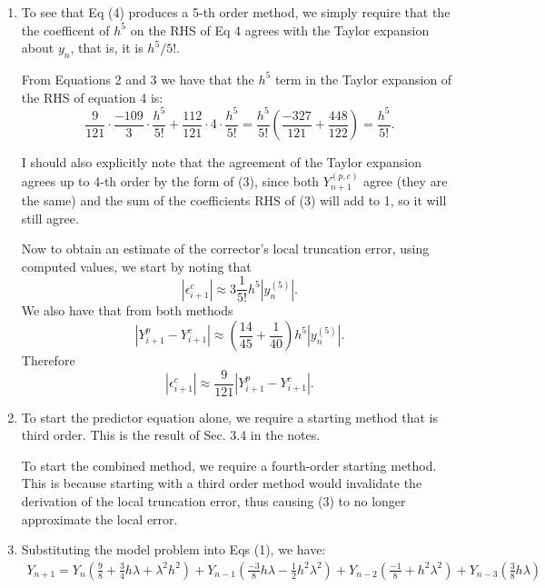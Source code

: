\documentclass[11pt]{article}
\def\f{\frac }
\begin{document}
\begin{enumerate}
\begin{enumerate}
\item To see that Eq (4) produces a 5-th order method, we simply require that the the coefficent of $h^5$ on the RHS of Eq 4 agrees with the Taylor expansion about $y_n$, that is, it is $h^5/5!$.

From Equations 2 and 3 we have that the $h^5$ term in the Taylor expansion of the RHS of equation 4 is:
\[ \f{9}{121} \cdot \f{-109}{3} \cdot \f{h^5}{5!} + \f{112}{121} \cdot 4 \cdot \f{h^5}{5!}  = \f{h^5}{5!} \left ( \f{-327}{121} + \f{448}{122} \right ) = \f{h^5}{5!} .\]

I should also explicitly note that the agreement of the Taylor expansion agrees up to 4-th order by the form of (3), since both $Y_{n+1} ^{(p,c)}$ agree (they are the same) and the sum of the coefficients RHS of (3) will add to 1, so it will still agree.

Now to obtain an estimate of the corrector's local truncation error, using computed values, we start by noting that
\[ \left |\epsilon ^c _{i+1} \right | \approx 3\f{1}{5!} h^5 \left | y_n^{(5)} \right | .\]
We also have that from both methods
\[ \left | Y_{i+1} ^p - Y_{i+1} ^c \right | \approx \left ( \f{14}{45} + \f{1}{40} \right ) h^5 \left | y_{n}^{(5)} \right | .\]
Therefore
\[ \left |\epsilon ^c _{i+1} \right | \approx \f{9}{121} \left | Y_{i+1} ^p - Y_{i+1} ^c \right |.\]

\item To start the predictor equation alone, we require a starting method that is third order.
This is the result of Sec. 3.4 in the notes.

To start the combined method, we require a fourth-order starting method.
This is because starting with a third order method would invalidate the derivation of the local truncation error, thus causing (3) to no longer approximate the local error.

\item Substituting the model problem into Eqs (1), we have:
\begin{align*} Y_{n+1}  = Y_n \left ( \f{9}{8} + \f{3}{4} h \lambda + \lambda ^2 h^2 \right ) + Y_{n-1} \left ( \f{-3}{8} h \lambda - \f{1}{2} h^2 \lambda ^2 \right ) + Y_{n-2} \left ( \f{-1}{8} + h^2 \lambda ^2 \right ) + Y_{n-3} \left ( \f{3}{8} h  \lambda \right ) \end{align*}


\end{enumerate}
\end{enumerate}
\end{document}
